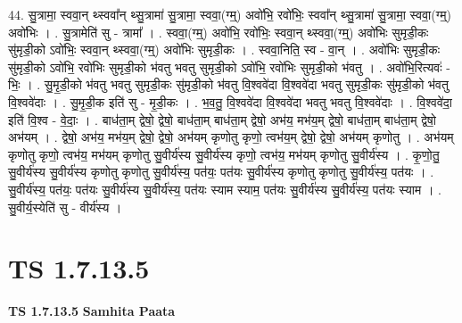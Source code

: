 \documentclass[17pt]{extarticle}
\begin{document}
44. सु॒त्रामा॒ स्ववा॒न् थ्स्ववा᳚न् थ्सु॒त्रामा॑ सु॒त्रामा॒ स्ववा॒(ग्म्॒) अवो॑भि॒ रवो॑भिः॒ स्ववा᳚न् थ्सु॒त्रामा॑ सु॒त्रामा॒ स्ववा॒(ग्म्॒) अवो॑भिः । . सु॒त्रामेति॑ सु - त्रामा᳚ । . स्ववा॒(ग्म्॒) अवो॑भि॒ रवो॑भिः॒ स्ववा॒न् थ्स्ववा॒(ग्म्॒) अवो॑भिः सुमृडी॒कः सु॑मृडी॒को ऽवो॑भिः॒ स्ववा॒न् थ्स्ववा॒(ग्म्॒) अवो॑भिः सुमृडी॒कः । . स्ववा॒निति॒ स्व - वा॒न् । . अवो॑भिः सुमृडी॒कः सु॑मृडी॒को ऽवो॑भि॒ रवो॑भिः सुमृडी॒को भ॑वतु भवतु सुमृडी॒को ऽवो॑भि॒ रवो॑भिः सुमृडी॒को भ॑वतु । . अवो॑भि॒रित्यवः॑ - भिः॒ । . सु॒मृ॒डी॒को भ॑वतु भवतु सुमृडी॒कः सु॑मृडी॒को भ॑वतु वि॒श्ववे॑दा वि॒श्ववे॑दा भवतु सुमृडी॒कः सु॑मृडी॒को भ॑वतु वि॒श्ववे॑दाः । . सु॒मृ॒डी॒क इति॑ सु - मृ॒डी॒कः । . भ॒व॒तु॒ वि॒श्ववे॑दा वि॒श्ववे॑दा भवतु भवतु वि॒श्ववे॑दाः । . वि॒श्ववे॑दा॒ इति॑ वि॒श्व - वे॒दाः॒ । . बाध॑ता॒म् द्वेषो॒ द्वेषो॒ बाध॑ता॒म् बाध॑ता॒म् द्वेषो॒ अभ॑य॒ मभ॑य॒म् द्वेषो॒ बाध॑ता॒म् बाध॑ता॒म् द्वेषो॒ अभ॑यम् । . द्वेषो॒ अभ॑य॒ मभ॑य॒म् द्वेषो॒ द्वेषो॒ अभ॑यम् कृणोतु कृणो॒ त्वभ॑य॒म् द्वेषो॒ द्वेषो॒ अभ॑यम् कृणोतु । . अभ॑यम् कृणोतु कृणो॒ त्वभ॑य॒ मभ॑यम् कृणोतु सु॒वीर्य॑स्य सु॒वीर्य॑स्य कृणो॒ त्वभ॑य॒ मभ॑यम् कृणोतु सु॒वीर्य॑स्य । . कृ॒णो॒तु॒ सु॒वीर्य॑स्य सु॒वीर्य॑स्य कृणोतु कृणोतु सु॒वीर्य॑स्य॒ पत॑यः॒ पत॑यः सु॒वीर्य॑स्य कृणोतु कृणोतु सु॒वीर्य॑स्य॒ पत॑यः । . सु॒वीर्य॑स्य॒ पत॑यः॒ पत॑यः सु॒वीर्य॑स्य सु॒वीर्य॑स्य॒ पत॑यः स्याम स्याम॒ पत॑यः सु॒वीर्य॑स्य सु॒वीर्य॑स्य॒ पत॑यः स्याम । . सु॒वीर्य॒स्येति॑ सु - वीर्य॑स्य । \newline
\pagebreak
{}

\section{ TS 1.7.13.5 }

\textbf{TS 1.7.13.5 } \newline
\textbf{Samhita Paata} \newline
\end{document}
